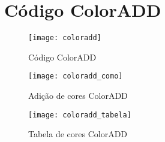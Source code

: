 \chapter{Código ColorADD} \label{coloradd}


\begin{figure}[ht]
\begin{minipage}[b]{0.45\linewidth}
\centering
\texttt{[image: coloradd]}
    \caption{Código ColorADD}
    \label{fig:coloradd}
\end{minipage}
\hspace{0.5cm}
\begin{minipage}[b]{0.45\linewidth}
\centering
    \texttt{[image: coloradd\_como]}
    \caption{Adição de cores ColorADD}
    \label{fig:coloradd_como}
\end{minipage}
\end{figure}

\begin{figure}[t]
  \begin{center}
    \leavevmode
    \texttt{[image: coloradd\_tabela]}
    \caption{Tabela de cores ColorADD}
    \label{fig:coloradd_tabela}
  \end{center}
\end{figure}
